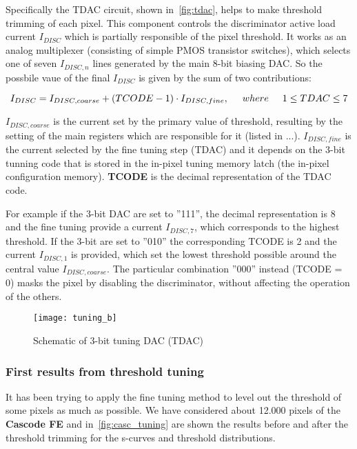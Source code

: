 Specifically the TDAC circuit, shown in~\autoref{fig:tdac}, helps to make threshold trimming of each pixel. This component controls the discriminator active load current $I_{DISC}$ which is partially responsible of the pixel threshold. It works as an analog multiplexer (consisting of simple PMOS transistor switches), which selects one of seven $I_{DISC, n}$ lines generated by the main 8-bit biasing DAC. So the possbile vaue of the final $I_{DISC}$ is given by the sum of two contributions:

\begin{equation}
I_{DISC} = I_{DISC, coarse} + (TCODE - 1) \cdot I_{DISC,fine},  \hspace{.5cm}	where \hspace{.5cm} 1 \leq TDAC \leq 7
\label{eq:tuning_eq}
\end{equation}

\textbf{$I_{DISC, coarse}$} is the current set by the primary value of threshold, resulting by the setting of the main registers which are responsible for it (listed in ...). 
\textbf{$I_{DISC, fine}$} is the current selected by the fine tuning step (TDAC) and it depends on the 3-bit tunning code that is stored in the in-pixel tuning memory latch (the in-pixel configuration memory).
\textbf{TCODE} is the decimal representation of the TDAC code. 

For example if the 3-bit DAC are set to ''111'', the decimal representation is 8 and the fine tuning provide a current $I_{DISC,7}$, which corresponds to the highest threshold. If the 3-bit are set to ''010'' the corresponding TCODE is 2 and the current $I_{DISC,1}$ is provided,  which set the lowest threshold possible around the central value $I_{DISC,coarse}$. The particular combination ''000'' instead (TCODE = 0) masks the pixel by disabling the discriminator, without affecting the operation of the others.

\begin{figure}
\centering
\texttt{[image: tuning\_b]}
\caption{Schematic of 3-bit tuning DAC (TDAC)}
\label{fig:tdac}
\end{figure}


\subsubsection{First results from threshold tuning}

It has been trying to apply the fine tuning method to level out the threshold of some pixels as much as possible. We have considered about 12.000 pixels of the \textbf{Cascode FE} and in~\autoref{fig:casc_tuning} are shown the results before and after the threshold trimming for the s-curves and threshold distributions.


